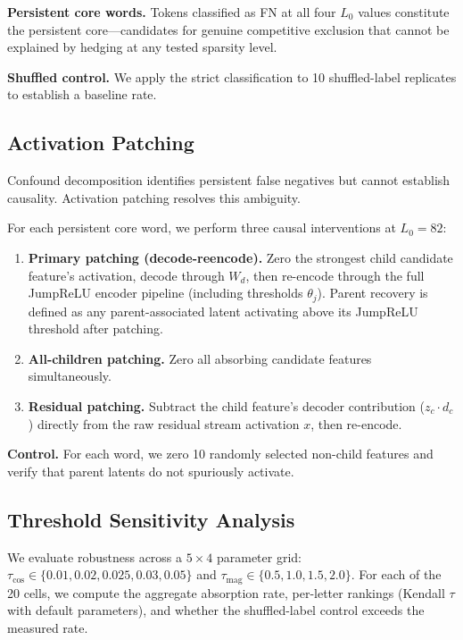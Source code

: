 \documentclass{article}
\begin{document}
\textbf{Persistent core words.} Tokens classified as FN at all four $L_0$ values constitute the persistent core---candidates for genuine competitive exclusion that cannot be explained by hedging at any tested sparsity level.

\textbf{Shuffled control.} We apply the strict classification to 10 shuffled-label replicates to establish a baseline rate.

\subsection{Activation Patching}

Confound decomposition identifies persistent false negatives but cannot establish causality. Activation patching resolves this ambiguity.

For each persistent core word, we perform three causal interventions at $L_0 = 82$:

\begin{enumerate}
\item \textbf{Primary patching (decode-reencode).} Zero the strongest child candidate feature's activation, decode through $W_d$, then re-encode through the full JumpReLU encoder pipeline (including thresholds $\theta_j$). Parent recovery is defined as any parent-associated latent activating above its JumpReLU threshold after patching.
\item \textbf{All-children patching.} Zero all absorbing candidate features simultaneously.
\item \textbf{Residual patching.} Subtract the child feature's decoder contribution ($z_c \cdot d_c$) directly from the raw residual stream activation $x$, then re-encode.
\end{enumerate}

\textbf{Control.} For each word, we zero 10 randomly selected non-child features and verify that parent latents do not spuriously activate.

\subsection{Threshold Sensitivity Analysis}
\label{sec:threshold}

We evaluate robustness across a $5 \times 4$ parameter grid: $\tau_{\cos} \in \{0.01, 0.02, 0.025, 0.03, 0.05\}$ and $\tau_{\text{mag}} \in \{0.5, 1.0, 1.5, 2.0\}$. For each of the 20 cells, we compute the aggregate absorption rate, per-letter rankings (Kendall $\tau$ with default parameters), and whether the shuffled-label control exceeds the measured rate.
\end{document}

